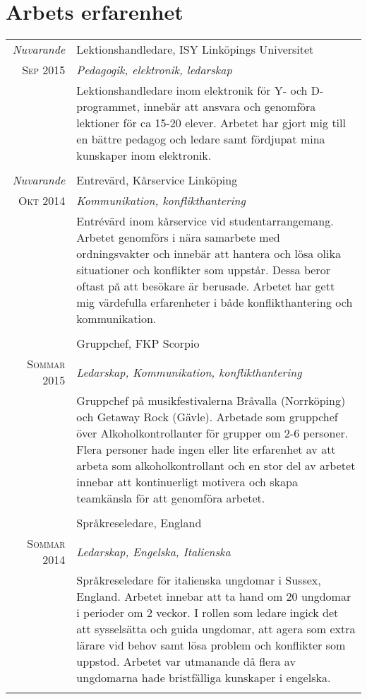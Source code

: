 \documentclass[a4paper,10pt]{article}
\begin{document}
\section{Arbets erfarenhet}
\begin{tabular}{r|p{11cm}}

    \emph{Nuvarande} &  Lektionshandledare, \textsc{ISY} Linköpings Universitet\\
    \textsc{Sep 2015} & \emph{Pedagogik, elektronik, ledarskap}\\
    &\footnotesize{Lektionshandledare inom elektronik för Y- och D-programmet, innebär att ansvara och genomföra lektioner för ca 15-20 elever. Arbetet har gjort mig till en bättre pedagog och ledare samt fördjupat mina kunskaper inom elektronik.}\\\multicolumn{2}{c}{} \\

    \emph{Nuvarande} & Entrevärd, Kårservice Linköping \\         \textsc{Okt 2014} & \emph{Kommunikation, konflikthantering}\\
    & \footnotesize{Entrévärd inom kårservice vid studentarrangemang. Arbetet genomförs i nära samarbete med ordningsvakter och innebär att hantera och lösa olika situationer och konflikter som uppstår. Dessa beror oftast på att besökare är berusade. Arbetet har gett mig värdefulla erfarenheter i både konflikthantering och kommunikation.}\\\multicolumn{2}{c}{} \\

    & Gruppchef, \textsc{FKP} Scorpio \\         
    \textsc{Sommar 2015} & \emph{Ledarskap, Kommunikation, konflikthantering}\\
    & \footnotesize{Gruppchef på musikfestivalerna Bråvalla (Norrköping) och Getaway Rock (Gävle). Arbetade som gruppchef över Alkoholkontrollanter för grupper om 2-6 personer. Flera personer hade ingen eller lite erfarenhet av att arbeta som alkoholkontrollant och en stor del av arbetet innebar att kontinuerligt motivera och skapa teamkänsla för att genomföra arbetet.}\\\multicolumn{2}{c}{} \\
    
    & Språkreseledare, England \\         
    \textsc{Sommar 2014} & \emph{Ledarskap, Engelska, Italienska }\\
    & \footnotesize{Språkreseledare för italienska ungdomar i Sussex, England. Arbetet innebar att ta hand om 20 ungdomar i perioder om 2 veckor. I rollen som ledare ingick det att sysselsätta och guida ungdomar, att agera som extra lärare vid behov samt lösa problem och konflikter som uppstod. Arbetet var utmanande då flera av ungdomarna hade bristfälliga kunskaper i engelska.} \\ \multicolumn{2}{c}{} \\
    

\end{tabular}
\end{document}
